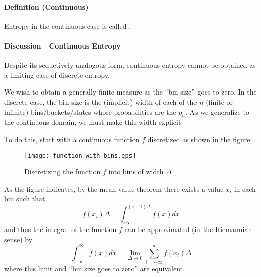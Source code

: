 \documentclass[12pt]{article}
\begin{document}
\paragraph{Definition (Continuous)}
Entropy in the continuous case is called \emph{}.


\paragraph{Discussion---Continuous Entropy}
Despite its seductively analogous form, continuous entropy cannot be obtained as a limiting case of discrete entropy.

We wish to obtain a generally finite measure as the ``bin size'' goes to zero.  In the discrete case, the bin size is the (implicit) width of each of the $n$ (finite or infinite) bins/buckets/states whose probabilities are the $p_n$.  As we generalize to the continuous domain, we must make this width explicit.

To do this, start with a continuous function $f$ discretized as shown in the figure:
\newline
\begin{figure}[!hbp]
\begin{center}
\caption{Discretizing the function $f$ into bins of width $\Delta$}
\texttt{[image: function-with-bins.eps]}
\end{center}
\end{figure}
As the figure indicates, by the mean-value theorem there exists a value $x_i$ in each bin such that 
\begin{equation}
f(x_i) \Delta = \int_{i\Delta}^{(i+1)\Delta} f(x) dx
\end{equation}
and thus the integral of the function $f$ can be approximated (in the Riemannian sense) by
\begin{equation}
\int_{-\infty}^{\infty} f(x) dx = \lim_{\Delta \to 0} \sum_{i = -\infty}^{\infty} f(x_i) \Delta
\end{equation}
where this limit and ``bin size goes to zero'' are equivalent.
\end{document}
